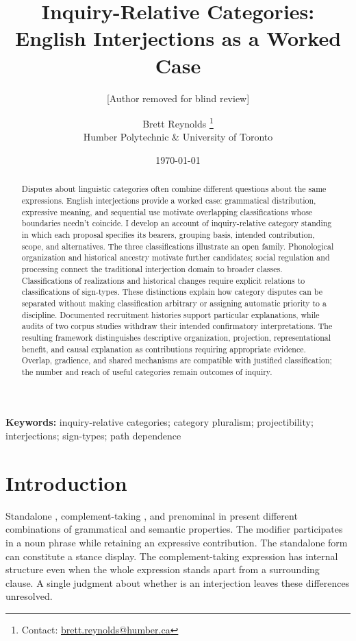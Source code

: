 \documentclass[12pt]{article}
\title{Inquiry-Relative Categories:\\English Interjections as a Worked Case}
\author{[Author removed for blind review]}
\author{Brett Reynolds \orcidlink{0000-0003-0073-7195}%
\thanks{Contact: \href{mailto:brett.reynolds@humber.ca}{brett.reynolds@humber.ca}}\\
Humber Polytechnic \& University of Toronto}
\date{\today}
\begin{document}
\maketitle

\begin{abstract}
Disputes about linguistic categories often combine different questions about
the same expressions. English interjections provide a worked case: grammatical
distribution, expressive meaning, and sequential use motivate overlapping
classifications whose boundaries needn't coincide. I develop an account of
inquiry-relative category standing in which each proposal specifies its
bearers, grouping basis, intended contribution, scope, and alternatives.
The three classifications illustrate an open family. Phonological organization
and historical ancestry motivate further candidates; social regulation and
processing connect the traditional interjection domain to broader classes.
Classifications of realizations and historical changes require explicit
relations to classifications of sign-types. These distinctions explain how
category disputes can be separated without making classification arbitrary
or assigning automatic priority to a discipline. Documented recruitment
histories support particular explanations, while audits of two corpus studies
withdraw their intended confirmatory interpretations. The resulting framework
distinguishes descriptive organization, projection, representational benefit,
and causal explanation as contributions requiring appropriate evidence.
Overlap, gradience, and shared mechanisms are compatible with justified
classification; the number and reach of useful categories remain outcomes
of inquiry.
\end{abstract}

\noindent\textbf{Keywords:} inquiry-relative categories; category pluralism;
projectibility; interjections; sign-types; path dependence


\section{Introduction}\label{sec:intro}

Standalone , complement-taking ,
and prenominal  in  present different
combinations of grammatical and semantic properties. The modifier participates
in a noun phrase while retaining an expressive contribution. The standalone
form can constitute a stance display. The complement-taking expression has
internal structure even when the whole expression stands apart from a
surrounding clause. A single judgment about whether  is an
interjection leaves these differences unresolved.
\end{document}
